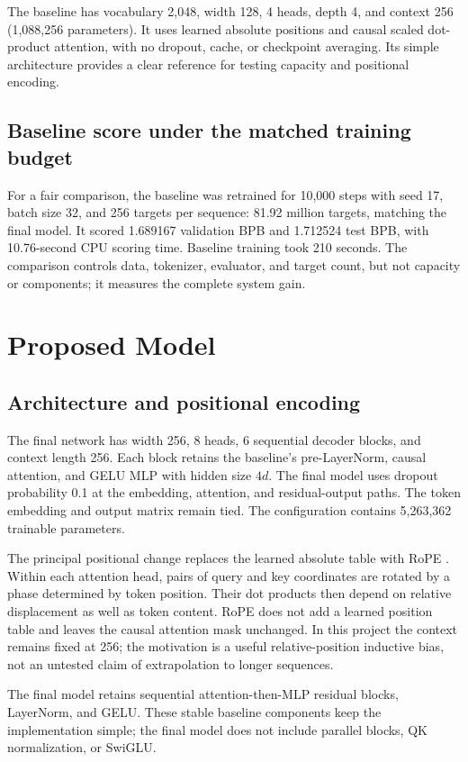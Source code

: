 \documentclass[11pt]{article}
\begin{document}
The baseline has vocabulary 2,048, width 128, 4 heads, depth 4, and context 256 (1,088,256 parameters). It uses learned absolute positions and causal scaled dot-product attention, with no dropout, cache, or checkpoint averaging. Its simple architecture provides a clear reference for testing capacity and positional encoding.

\subsection{Baseline score under the matched training budget}
For a fair comparison, the baseline was retrained for 10,000 steps with seed 17, batch size 32, and 256 targets per sequence: 81.92 million targets, matching the final model. It scored 1.689167 validation BPB and 1.712524 test BPB, with 10.76-second CPU scoring time. Baseline training took 210 seconds. The comparison controls data, tokenizer, evaluator, and target count, but not capacity or components; it measures the complete system gain.

\section{Proposed Model}
\subsection{Architecture and positional encoding}
The final network has width 256, 8 heads, 6 sequential decoder blocks, and context length 256. Each block retains the baseline's pre-LayerNorm, causal attention, and GELU MLP with hidden size $4d$. The final model uses dropout probability 0.1 at the embedding, attention, and residual-output paths. The token embedding and output matrix remain tied. The configuration contains 5,263,362 trainable parameters.

The principal positional change replaces the learned absolute table with RoPE \cite{su2021roformer}. Within each attention head, pairs of query and key coordinates are rotated by a phase determined by token position. Their dot products then depend on relative displacement as well as token content. RoPE does not add a learned position table and leaves the causal attention mask unchanged. In this project the context remains fixed at 256; the motivation is a useful relative-position inductive bias, not an untested claim of extrapolation to longer sequences.

The final model retains sequential attention-then-MLP residual blocks, LayerNorm, and GELU. These stable baseline components keep the implementation simple; the final model does not include parallel blocks, QK normalization, or SwiGLU.
\end{document}
